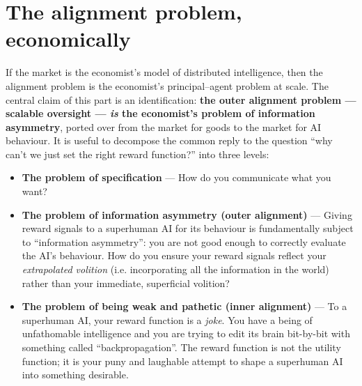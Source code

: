 
\section*{The alignment problem, economically}

\begin{draftblock}
\noindent If the market is the economist's model of distributed intelligence, then the alignment problem is the economist's principal--agent problem at scale. The central claim of this part is an identification: \textbf{the outer alignment problem --- scalable oversight --- \emph{is} the economist's problem of information asymmetry}, ported over from the market for goods to the market for AI behaviour. It is useful to decompose the common reply to the question ``why can't we just set the right reward function?'' into three levels:
\end{draftblock}

\begin{itemize}
\item \textbf{The problem of specification} --- How do you communicate what you want?
\item \textbf{The problem of information asymmetry (outer alignment)} --- Giving reward signals to a superhuman AI for its behaviour is fundamentally subject to ``information asymmetry'': you are not good enough to correctly evaluate the AI's behaviour. How do you ensure your reward signals reflect your \emph{extrapolated volition} (i.e. incorporating all the information in the world) rather than your immediate, superficial volition?
\item \textbf{The problem of being weak and pathetic (inner alignment)} --- To a superhuman AI, your reward function is a \emph{joke}. You have a being of unfathomable intelligence and you are trying to edit its brain bit-by-bit with something called ``backpropagation''. The reward function is not the utility function; it is your puny and laughable attempt to shape a superhuman AI into something desirable.
\end{itemize}

